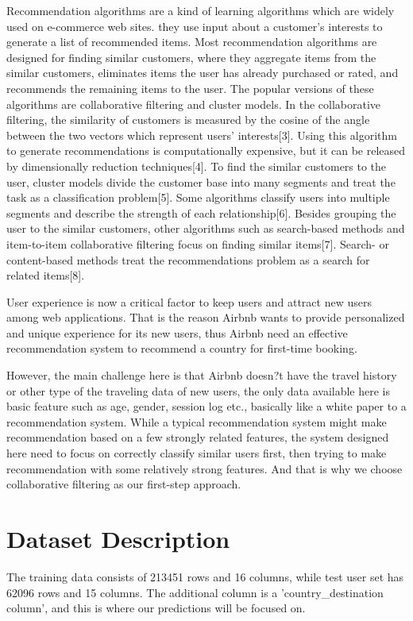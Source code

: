 \documentclass{sig-alternate-05-2015}
\begin{document}
Recommendation algorithms are a kind of learning algorithms which are widely used on e-commerce web sites.  they use input about a customer's interests to generate a list of recommended items. Most recommendation algorithms are designed for finding similar customers, where they aggregate items from the similar customers, eliminates items the user has already purchased or rated, and recommends the remaining items to the user. The popular versions of these algorithms are collaborative filtering and cluster models. In the collaborative filtering, the similarity of customers is measured by the cosine of the angle between the two vectors which represent users' interests[3]. Using this algorithm to generate recommendations is computationally expensive, but it can be released by dimensionally reduction techniques[4]. To find the similar customers to the user, cluster models divide the customer base into many segments and treat the task as a classification problem[5].  Some algorithms classify users into multiple segments and describe the strength of each relationship[6]. Besides grouping the user to the similar customers, other algorithms such as search-based methods and item-to-item collaborative filtering focus on finding similar items[7]. Search- or content-based methods treat the recommendations problem as a search for related items[8].

User experience is now a critical factor to keep users and attract new users among web applications. That is the reason Airbnb wants to provide personalized and unique experience for its new users, thus Airbnb need an effective recommendation system to recommend a country for first-time booking.

However, the main challenge here is that Airbnb doesn?t have the travel history or other type of the traveling data of new users, the only data available here is basic feature such as age, gender, session log etc., basically like a white paper to a recommendation system. While a typical recommendation system might make recommendation based on a few strongly related features, the system designed here need to focus on correctly classify similar users first, then trying to make recommendation with some relatively strong features. And that is why we choose collaborative filtering as our first-step approach.

\section{Dataset Description}
The training data consists of 213451 rows and 16 columns, while test user set has 62096 rows and 15 columns. The additional column is a 'country\_destination column', and this is where our predictions will be focused on.
\end{document}
